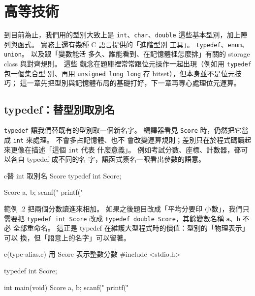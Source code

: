 \chapter{高等技術}
\label{ch:extendedtechniques}

到目前為止，我們用的型別大致上是 \texttt{int}、\texttt{char}、\texttt{double}
這些基本型別，加上陣列與函式。 實務上還有幾種 C 語言提供的「進階型別
工具」。 \texttt{typedef}、\texttt{enum}、\texttt{union}。 以及跟「變數能活
多久、誰能看到、在記憶體裡怎麼排」有關的 storage class 與對齊規則。 這些
觀念在題庫裡常常跟位元操作一起出現（例如用 \texttt{typedef} 包一個集合型
別、再用 \texttt{unsigned long long} 存 bitset），但本身並不是位元技巧；
這一章先把型別與記憶體布局的基礎打好，下一章再專心處理位元運算。

\section{typedef：替型別取別名}
\label{sec:ext-typedef}

\texttt{typedef} 讓我們替既有的型別取一個新名字。 編譯器看見
\texttt{Score} 時，仍然把它當成 \texttt{int} 來處理。 不會多占記憶體、也不
會改變運算規則；差別只在於程式碼讀起來更像在描述「這個 \texttt{int} 代表
什麼意義」。 例如考試分數、座標、計數器，都可以各自 typedef 成不同的名
字，讓函式簽名一眼看出參數的語意。

\begin{code}{c}{替 int 取別名 Score}
typedef int Score;

Score a, b;
scanf("%
printf("%
\end{code}

範例 \thechapter.2 把兩個分數讀進來相加。 如果之後題目改成「平均分要印
小數」，我們只需要把 \texttt{typedef int Score} 改成
\texttt{typedef double Score}，其餘變數名稱 \texttt{a}、\texttt{b} 不必
全部重命名。 這正是 typedef 在維護大型程式時的價值：型別的「物理表示」可以
換，但「語意上的名字」可以留著。

\begin{example}{c}{(type-alias.c) 用 Score 表示整數分數}
#include <stdio.h>

typedef int Score;

int main(void) {
    Score a, b;
    scanf("%
    printf("%
}
\end{example}



